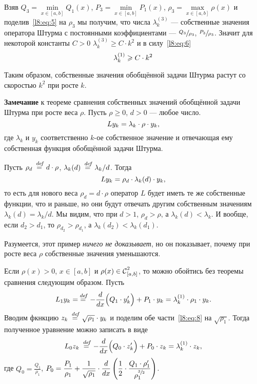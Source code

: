 \documentclass[12pt,a4paper,openany,fleqn]{book}
\newcommand {\defeq}{\stackrel{\hspace{0.09 cm}de\!f}{=}}
\newcommand {\eqdef}{\defeq}
\newcommand{\Cf}{\ensuremath{\mathcal{C}}}
\newcommand{\Cfn}[2][]{\ensuremath{\Cf{\mathstrut}^{#2}_{#1}}}
\newcommand{\der}[2]{\ensuremath{\frac{d#1}{d#2}}}
\theoremstyle{definition}
\begin{document}
	Взяв $Q_3=\displaystyle\min\limits_{x\in[a,b]}Q_1(x)$, $P_3=\displaystyle\min\limits_{x\in[a,b]}P_1(x)$, $\rho_3=\displaystyle\max\limits_{x\in[a,b]}\rho(x)$ и поделив~\eqref{l8:eq:5} на $\rho_3$ мы получим, что числа $\lambda_k^{(3)}$ --- собственные значения оператора Штурма с постоянными коэффициентами --- $\sfrac{Q_3}{\rho_3}$, $\sfrac{P_3}{\rho_3}$. Значит для некоторой константы $C>0$ $\lambda_k^{(3)}\geqslant C\cdot k^2$ и в силу~\eqref{l8:eq:6} 
	\begin{equation}\label{l8:eq:7}
	\hfill\lambda_k^{(1)}\geqslant C\cdot k^2\hfill
	\end{equation}
	
	Таким образом, собственные значения обобщённой задачи Штурма растут со скоростью $k^2$ при росте $k$.
	
	\noindent\textbf{Замечание} к теореме сравнения собственных значений обобщённой задачи Штурма при росте веса $\rho$. Пусть $\rho\geqslant0$, $d>0$ --- любое число.
	\begin{equation*}
		\hfill Ly_k=\lambda_k\cdot\rho\cdot y_k,\hfill
	\end{equation*}
	где $\lambda_k$ и $y_k$ соответственно $k$-ое собственное значение и отвечающая ему собственная функция обобщённой задачи Штурма. 
	
	Пусть $\rho_d\eqdef d\cdot\rho$, $\lambda_k(d)\eqdef\lambda_k/d$. Тогда 
	\begin{equation*}
		\hfill Ly_k=\rho_d\cdot\lambda_k(d)\cdot y_k,\hfill
	\end{equation*}
	то есть для нового веса $\rho_d=d\cdot\rho$ оператор $L$ будет иметь те же собственные функции, что и раньше, но они будут отвечать другим собственным значениям $\lambda_k(d)=\lambda_k/d$. Мы видим, что при $d>1$, $\rho_d>\rho$, а $\lambda_k(d)<\lambda_k$. И вообще, если $d_2>d_1$, то $\rho_{d_2}>\rho_{d_1}$, а $\lambda_k(d_2)<\lambda_k(d_1)$.
	
	Разумеется, этот пример \emph{ничего не доказывает}, но он показывает, почему при росте веса $\rho$ собственные значения уменьшаются.
	
	Если $\rho(x)>0$, $x\in[a,b]$ и $\rho(x)\in\Cfn[{[a,b]}]{2}$, то можно обойтись без теоремы сравнения следующим образом. Пусть
	\begin{equation}\label{l8:eq:8}
		\hfill L_1y_k=\eqdef-\der{}{x}\Big(Q_1\cdot y'_k\Big)+P_1\cdot y_k=\lambda_k^{(1)}\cdot\rho_1\cdot y_k.\hfill
	\end{equation}
	Вводим фкнкцию $z_k\eqdef\sqrt{\rho_1}\cdot y_k$ и поделим обе части~\eqref{l8:eq:8} на $\sqrt{\rho_1}$. Тогда полученное уравнение можно записать в виде
	\begin{equation}\label{l8:eq:9}
		\hfill L_0z_k\eqdef-\der{}{x}\Big(Q_0\cdot z'_k\Big)+P_0\cdot z_k=\lambda_k^{(1)}\cdot z_k,\hfill
	\end{equation}
	где $\displaystyle Q_0=\frac{Q_1}{\rho_1}$, $\displaystyle P_0=\frac{P_1}{\rho_1}+\frac1{\sqrt{\rho_1}}\cdot\der{}{x}\left(\frac12\cdot\frac{Q_1\cdot\rho'_1}{\rho_1^{\sfrac{3}{2}}}\right)$.
	
\end{document}
